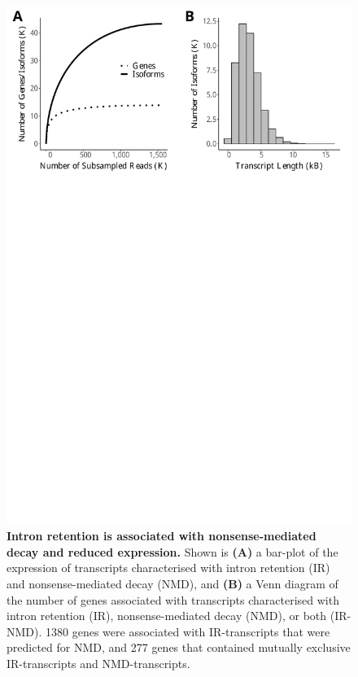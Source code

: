 \begin{figure}[!h]
	\begin{center}
		\includegraphics[page=6,trim={0 26cm 0 0},clip,scale = 0.55]{Figures/IsoSeqWholeTranscriptome.pdf}
	\end{center}
	\captionsetup{width=0.95\textwidth}
	\caption[Association of intron retention and nonsense-mediated decay]%
	{\textbf{Intron retention is associated with nonsense-mediated decay and reduced expression.} Shown is \textbf{(A)} a bar-plot of the expression of transcripts characterised with intron retention (IR) and nonsense-mediated decay (NMD), and \textbf{(B)} a Venn diagram of the number of genes associated with transcripts characterised with intron retention (IR), nonsense-mediated decay (NMD), or both (IR-NMD). 1380 genes were associated with IR-transcripts that were predicted for NMD, and 277 genes that contained mutually exclusive IR-transcripts and NMD-transcripts. }
	\label{fig:isoseq_whole_IRNMD}
\end{figure}


